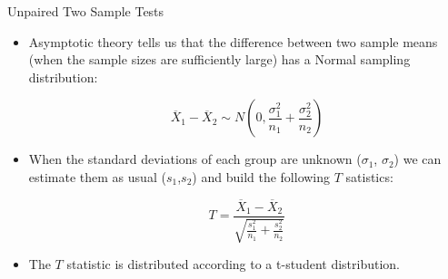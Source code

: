 \documentclass[handout]{beamer}
\begin{document}
\begin{frame}[fragile]{Unpaired Two Sample Tests}
 \scriptsize{

\begin{itemize}
 
 \item Asymptotic theory tells us that the difference between two sample means (when the sample sizes are sufficiently large) has a Normal sampling distribution:
 
 \begin{displaymath}
  \overline{X}_{1}-\overline{X}_{2} \sim N\left(0, \frac{\sigma_1^{2}}{n_1} + \frac{\sigma_2^{2}}{n_2}\right)
 \end{displaymath}

  
 \item When the standard deviations of each group are unknown ($\sigma_1$, $\sigma_2$) we can estimate them as usual ($s_1$,$s_2$) and build the following $T$ satistics:
 
  \begin{displaymath}
  T = \frac{ \overline{X}_{1}-\overline{X}_{2}}{\sqrt{\frac{s_1^{2}}{n_1} + \frac{s_2^{2}}{n_2}}}
 \end{displaymath}

 \item The $T$ statistic is distributed according to a t-student distribution.
 
 
\end{itemize}



}
\end{frame}
\end{document}
